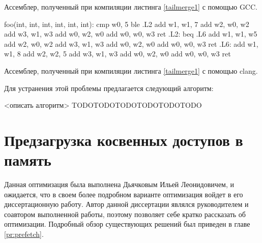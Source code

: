 \begin{ListingEnv}[!h]
	\captiondelim{ } %
	\caption{Ассемблер, полученный при компиляции листинга \ref{tailmerge1}  с помощью GCC.}\label{tailmerge2}
	\begin{Verb}
			foo(int, int, int, int, int, int):
			cmp     w0, 5
			ble     .L2
			add     w1, w1, 7
			add     w2, w0, w2
			add     w3, w1, w3
			add     w0, w2, w0
			add     w0, w0, w3
			ret
			.L2:
			beq     .L6
			add     w1, w1, w5
			add     w2, w0, w2
			add     w3, w1, w3
			add     w0, w2, w0
			add     w0, w0, w3
			ret
			.L6:
			add     w1, w1, 8
			add     w2, w2, 5
			add     w3, w1, w3
			add     w0, w2, w0
			add     w0, w0, w3
			ret

	\end{Verb}
\end{ListingEnv}
\begin{ListingEnv}[!h]
	\captiondelim{ } %
	\caption{Ассемблер, полученный при компиляции листинга \ref{tailmerge1}  с помощью clang.}\label{tailmerge3}
\end{ListingEnv}


Для устранения этой проблемы предлагается следующий алгоритм:

<описать алгоритм>
TODOTODOTODOTODOTODOTODO


\section{Предзагрузка косвенных доступов в память} \label{opt:prefetch}
Данная оптимизация была выполнена Дьячковым Ильей Леонидовичем, и ожидается, что в своем более подробном варианте оптимизация войдет в его диссертационную работу.  Автор данной диссертации являлся руководителем и соавтором выполненной работы, поэтому позволяет себе кратко рассказать  об оптимизации.  Подробный обзор существующих решений был приведен в главе \ref{pr:prefetch}. 

